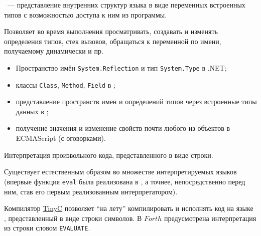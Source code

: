 
\ --- представление внутренних структур
языка в виде переменных встроенных типов с возможностью доступа к ним из
программы.

Позволяет во время выполнения просматривать, создавать и изменять определения
типов, стек вызовов, обращаться к переменной по имени, получаемому динамически и
пр.

\begin{itemize}[nosep]
  \item 
Пространство имён \verb|System.Reflection| и тип \verb|System.Type| в .NET;
  \item 
классы \verb|Class|, \verb|Method|, \verb|Field| в \java;
  \item 
представление пространств имен и определений типов через встроенные типы данных
в \py;
  \item 
получение значения и изменение свойств почти любого из объектов в ECMAScript (с
оговорками).
\end{itemize}


Интерпретация произвольного кода, представленного в виде строки.

Существует естественным образом во множестве интерпретируемых языков (впервые
функция \verb|eval| была реализована в \lisp, а точнее, непосредственно перед
ним, став его первым реализованным интерпретатором).

Компилятор \href{https://ru.wikipedia.org/wiki/Tiny_C_Compiler}{TinyC} позволяет
``на лету'' компилировать и исполнять код на языке \ci, представленный в виде
строки символов. В
\href{https://ru.wikipedia.org/wiki/%D0%A4%D0%BE%D1%80%D1%82_(%D1%8F%D0%B7%D1%8B%D0%BA_%D0%BF%D1%80%D0%BE%D0%B3%D1%80%D0%B0%D0%BC%D0%BC%D0%B8%D1%80%D0%BE%D0%B2%D0%B0%D0%BD%D0%B8%D1%8F)}{$Forth$}
предусмотрена интерпретация из строки словом \verb|EVALUATE|.

\secup

\secup
